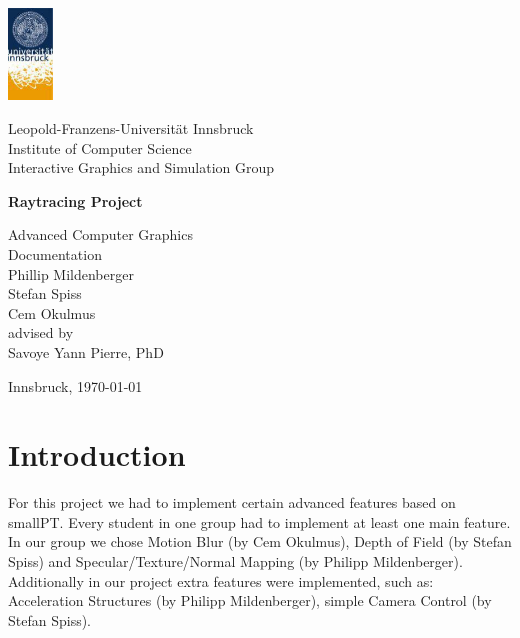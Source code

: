 \documentclass[11pt,a4paper]{article}
\begin{document}

\begin{titlepage} %

\begin{center}
\includegraphics[width=1.2cm]{images/uibk}

\begin{large}
Leopold-Franzens-Universität Innsbruck\\[5mm]
Institute of Computer Science\\
Interactive Graphics and Simulation Group\\[25mm]
\end{large}

{\LARGE \bf Raytracing Project}

Advanced Computer Graphics\\ 
Documentation\\[15mm]

Phillip Mildenberger\\
Stefan Spiss\\
Cem Okulmus\\[35mm]

advised by\\
Savoye Yann Pierre, PhD\\[10mm]

\vfill

Innsbruck, \today
\end{center}

\end{titlepage}



\section{Introduction}
For this project we had to implement certain advanced features based on smallPT. Every student in one group had to implement at least one main feature. In our group we chose Motion Blur (by Cem Okulmus), Depth of Field (by Stefan Spiss) and Specular/Texture/Normal Mapping (by Philipp Mildenberger). Additionally in our project extra features were implemented, such as: Acceleration Structures (by Philipp Mildenberger), simple Camera Control (by Stefan Spiss).
\end{document}
